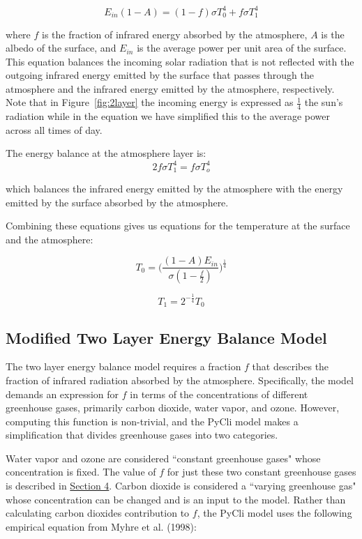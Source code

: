 \documentclass[12pt]{article} %
\begin{document}
$$E_{in}(1-A)  = (1-f) \sigma T_0^4 + f \sigma T_1^4$$

where $f$ is the fraction of infrared energy absorbed by the atmosphere, $A$ is the albedo of the surface, and $E_{in}$ is the average power per unit area of the surface. This equation balances the incoming solar radiation that is not reflected with the outgoing infrared energy emitted by the surface that passes through the atmosphere and the infrared energy emitted by the atmosphere, respectively. Note that in Figure~\ref{fig:2layer} the incoming energy is expressed as $\frac{1}{4}$ the sun's radiation while in the equation we have simplified this to the average power across all times of day.

The energy balance at the atmosphere layer is: 
$$2f\sigma T_1^4 = f\sigma T_o^4$$

which balances the infrared energy emitted by the atmosphere with the energy emitted by the surface absorbed by the atmosphere.

Combining these equations gives us equations for the temperature at the surface and the atmosphere:

$$T_0 = \bigg( \frac{(1-A)E_{in}}{\sigma(1-\frac{f}{2})}  \bigg)^{\frac{1}{4}}$$

$$T_1 =  2^{-\frac{1}{4}} T_0 $$

\subsection{Modified Two Layer Energy Balance Model}

The two layer energy balance model requires a fraction $f$ that describes the fraction of infrared radiation absorbed by the atmosphere. Specifically, the model demands an expression for $f$ in terms of the concentrations of different greenhouse gases, primarily carbon dioxide, water vapor, and ozone. However, computing this function is non-trivial, and the PyCli model makes a simplification that divides greenhouse gases into two categories.

Water vapor and ozone are considered ``constant greenhouse gases" whose concentration is fixed. The value of $f$ for just these two constant greenhouse gases is described in \hyperref[sec:atmos]{Section 4}. Carbon dioxide is considered a ``varying greenhouse gas" whose concentration can be changed and is an input to the model. Rather than calculating carbon dioxides contribution to $f$, the PyCli model uses the following empirical equation from Myhre et al. (1998):
\end{document}
